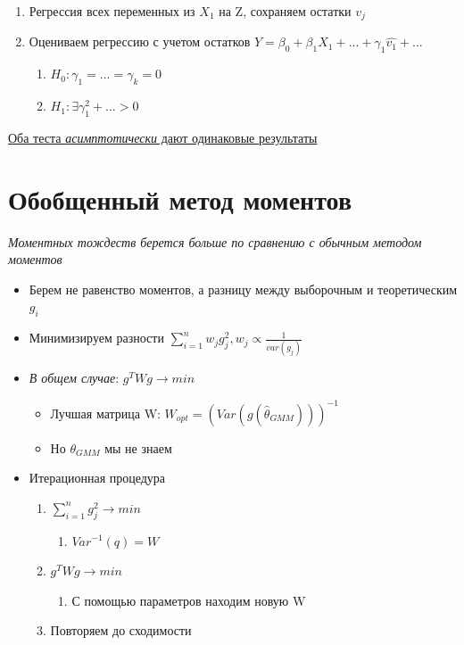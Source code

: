 \documentclass[a4paper, 12pt]{article}
\begin{document}
\begin{enumerate}
    \item Регрессия всех переменных из $X_{1}$ на Z, сохраняем остатки $v_{j}$
    \item Оцениваем регрессию с учетом остатков $Y = \beta_{0} + \beta_{1}X_{1} + ... + \gamma_{1}\hat{v_{1}} + ...$
    \begin{enumerate}
        \item $H_{0}: \gamma_{1} = ... = \gamma_{k} = 0$
        \item $H_{1}: \exists \gamma_{1}^{2} + ... > 0$
    \end{enumerate}
\end{enumerate}

\begin{center}
    \underline{Оба теста \textit{асимптотически} дают одинаковые результаты}
\end{center}

\section{Обобщенный метод моментов}\label{GMM}

\textit{Моментных тождеств берется больше по сравнению с обычным методом моментов}

\begin{itemize}
    \item Берем не равенство моментов, а разницу между выборочным и теоретическим $g_{i}$
    \item Минимизируем разности $\sum_{i = 1}^{n}w_{j}g_{j}^{2}, w_{j} \propto \frac{1}{var(g_{j})}$
    \item \textit{В общем случае}: $g^{T}Wg \rightarrow min$
    \begin{itemize}
        \item Лучшая матрица W: $W_{opt} = (Var(g(\hat{\theta}_{GMM})))^{-1}$
        \item Но $\theta_{GMM}$ мы не знаем
    \end{itemize}
    \item Итерационная процедура
    \begin{enumerate}
        \item $\sum_{i = 1}^{n}g_{j}^{2} \rightarrow min$
        \begin{enumerate}
            \item $Var^{-1}(q) = W$
        \end{enumerate}
        \item $g^{T}Wg \rightarrow min$
        \begin{enumerate}
            \item С помощью параметров находим новую W
        \end{enumerate}
        \item Повторяем до сходимости
    \end{enumerate}
\end{itemize}
\end{document}
